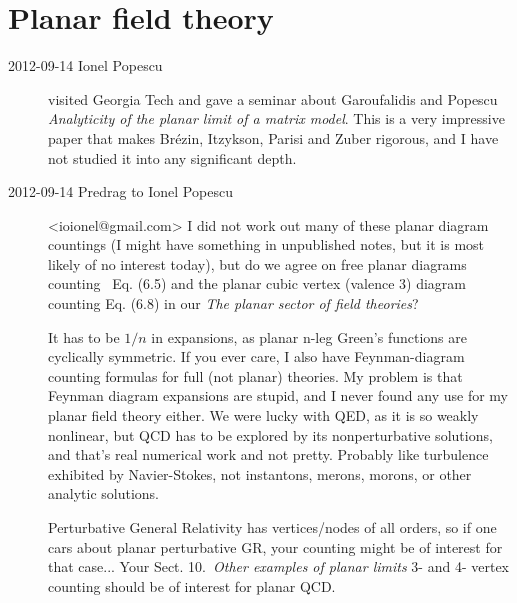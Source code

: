 
\chapter{Planar field theory}
\label{c-planar}

\begin{description}


\item[2012-09-14 Ionel Popescu] visited Georgia Tech and gave a seminar
about Garoufalidis and Popescu {\em Analyticity of the
planar limit of a matrix model}. This is a very impressive paper that
makes Br{\'{e}}zin, Itzykson, Parisi and Zuber rigorous, and I
have not studied it into any significant depth.

\item[2012-09-14 Predrag to Ionel Popescu] <ioionel@gmail.com>
I did not work out many of these planar diagram countings (I might have
something in unpublished notes, but it is most likely of no interest
today), but do we agree on free planar diagrams counting  Eq. (6.5) and the
planar cubic vertex (valence 3) diagram counting Eq. (6.8)
in our 
{{\em The planar sector of field theories}}?

It has to be $1/n$ in expansions, as planar n-leg Green's functions are
cyclically symmetric. If you ever care, I also have Feynman-diagram
counting formulas for full (not planar) theories. My problem is that Feynman
diagram expansions are
{stupid},
and I never found any use for my planar field
theory
{either}.
We were lucky with QED, as it is so weakly nonlinear, but QCD has
to be explored by its nonperturbative solutions, and that's real numerical
work and not pretty. Probably like turbulence exhibited by Navier-Stokes,
not instantons, merons, morons, or other analytic solutions.

Perturbative General Relativity has vertices/nodes of all orders, so if one
cars about planar perturbative GR, your counting might be of interest for
that case... Your Sect. 10.~{\em Other examples of planar limits} 3- and 4-
vertex counting should be of interest for planar QCD.


\end{description}
